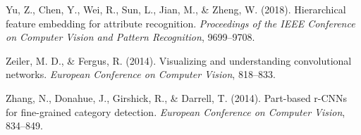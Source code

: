 \documentclass[
]{article}
\newlength{\cslhangindent}
\newenvironment{CSLReferences}[2] %
 {\begin{list}{}{%
  \setlength{\itemindent}{0pt}
  \setlength{\leftmargin}{0pt}
  \setlength{\parsep}{0pt}
  \ifodd #1
   \setlength{\leftmargin}{\cslhangindent}
   \setlength{\itemindent}{-1\cslhangindent}
  \fi
  \setlength{\itemsep}{#2\baselineskip}}}
 {\end{list}}
\begin{document}
\begin{CSLReferences}{1}{0}
Yu, Z., Chen, Y., Wei, R., Sun, L., Jian, M., \& Zheng, W. (2018).
Hierarchical feature embedding for attribute recognition.
\emph{Proceedings of the IEEE Conference on Computer Vision and Pattern
Recognition}, 9699--9708.

Zeiler, M. D., \& Fergus, R. (2014). Visualizing and understanding
convolutional networks. \emph{European Conference on Computer Vision},
818--833.

Zhang, N., Donahue, J., Girshick, R., \& Darrell, T. (2014). Part-based
r-CNNs for fine-grained category detection. \emph{European Conference on
Computer Vision}, 834--849.

\end{CSLReferences}
\end{document}
